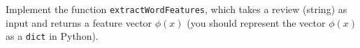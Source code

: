 \item {}

Implement the function {\tt extractWordFeatures}, which takes a review (string)
as input and returns a feature vector $\phi(x)$ (you should represent the vector
$\phi(x)$ as a {\tt dict} in Python).
